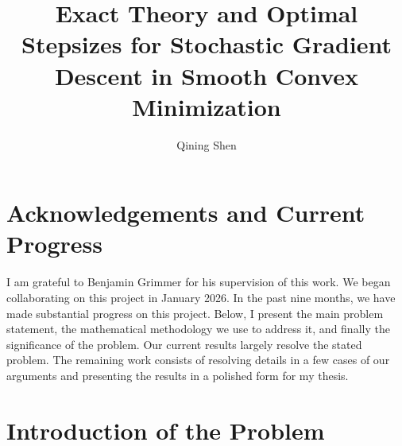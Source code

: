 \documentclass[11pt]{article}
\title{Exact Theory and Optimal Stepsizes for Stochastic Gradient Descent in Smooth Convex Minimization}
\author{Qining Shen}
\date{}
\begin{document}
\maketitle


\section{Acknowledgements and Current Progress}

I am grateful to Benjamin Grimmer for his supervision of this work. We began collaborating on this project in January 2026. In the past nine months, we have made substantial progress on this project. Below, I present the main problem statement, the mathematical methodology we use to address it, and finally the significance of the problem. Our current results largely resolve the stated problem. The remaining work consists of resolving details in a few cases of our arguments and presenting the results in a polished form for my thesis.



\section{Introduction of the Problem}
\end{document}
